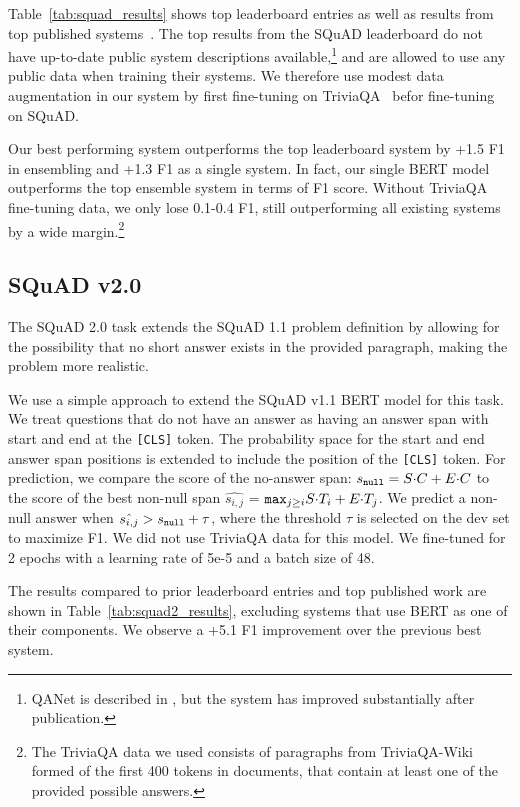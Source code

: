 


Table~\ref{tab:squad_results} shows top leaderboard entries as well as results from top published systems~\cite{bidaf,clark-gardner:2018:_simpl,peters-etal:2018:_deep,hu2017reinforced}.
The top results from the SQuAD leaderboard do not have up-to-date public system descriptions available,\footnote{QANet is described in , but the system has improved substantially after publication.} and are allowed to use any public data when training their systems. We therefore use modest data augmentation in our system by first fine-tuning on TriviaQA~\cite{joshi-etal:2017:_triviaq} befor fine-tuning on SQuAD.

Our best performing system outperforms the top leaderboard system by +1.5 F1 in ensembling and +1.3 F1 as a single system. In fact, our single BERT model outperforms the top ensemble system in terms of F1 score. Without TriviaQA fine-tuning data, we only lose 0.1-0.4 F1, still outperforming all existing systems by a wide margin.\footnote{The TriviaQA data we used consists of paragraphs from TriviaQA-Wiki formed of the first 400 tokens in documents, that contain at least one of the provided possible answers.}

\subsection{SQuAD v2.0}

The SQuAD 2.0 task extends the SQuAD 1.1 problem definition by allowing for the possibility that no short answer exists in the provided paragraph, making the problem more realistic.

We use a simple approach to extend the SQuAD v1.1 BERT model for this task. We treat questions that do not have an answer as having an answer span with start and end at the {\tt [CLS]} token. The probability space for the start and end answer span positions is extended to include the position of the {\tt [CLS]} token. For prediction, we compare the score of the no-answer span: $s_{\tt null} = S{\cdot}C + E{\cdot}C$ to the score of the best non-null span $\hat{s_{i,j}}$ =  $ {\tt max}_{j \geq i} S{\cdot}T_i + E{\cdot}T_j$. We predict a non-null answer when  $\hat{s_{i,j}} > s_{\tt null} + \tau $, where the threshold $\tau$ is selected on the dev set to maximize F1. We did not use TriviaQA data for this model. We fine-tuned for 2 epochs with a learning rate of 5e-5 and a batch size of 48.

The results compared to prior leaderboard entries and top published work \cite{unet,slqa} are shown in Table~\ref{tab:squad2_results}, excluding systems that use BERT as one of their components. We observe a +5.1 F1 improvement over the previous best system.


